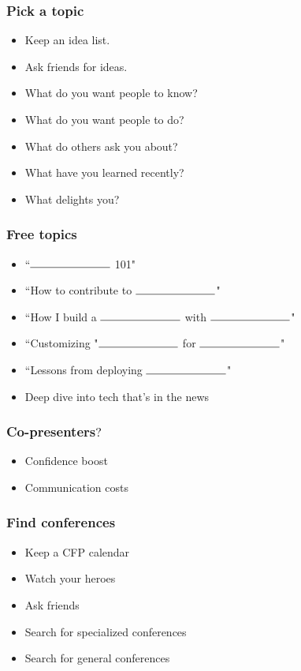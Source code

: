 \documentclass{beamer}
\begin{document}
\begin{frame}[fragile]
\tableofcontents[currentsection]
\end{frame}

\begin{frame}
\frametitle{Pick a topic}
\begin{itemize}[<+(1)->]
\item Keep an idea list.
\item Ask friends for ideas.
\item What do you want people to know?
\item What do you want people to do?
\item What do others ask you about?
\item What have you learned recently?
\item What delights you?
\end{itemize}
\end{frame}

\begin{frame}[fragile]
\frametitle{Free topics}
\begin{itemize}[<+(1)->]
\item ``$\rule{1in}{0.15mm}$ 101"
\item ``How to contribute to $\rule{1in}{0.15mm}$"
\item ``How I build a $\rule{1in}{0.15mm}$ with $\rule{1in}{0.15mm}$"
\item ``Customizing "$\rule{1in}{0.15mm}$ for $\rule{1in}{0.15mm}$"
\item ``Lessons from deploying $\rule{1in}{0.15mm}$"
\item Deep dive into tech that's in the news
\end{itemize}
\end{frame}

\begin{frame}[fragile]
\frametitle{Co-presenters$?$}
\begin{itemize}[<+(1)->]
\item Confidence boost
\item Communication costs
\end{itemize}
\end{frame}

\begin{frame}[fragile]
\frametitle{Find conferences}
\begin{itemize}[<+(1)->]
\item Keep a CFP calendar
\item Watch your heroes
\item Ask friends
\item Search for specialized conferences
\item Search for general conferences
\end{itemize}
\end{frame}
\end{document}
